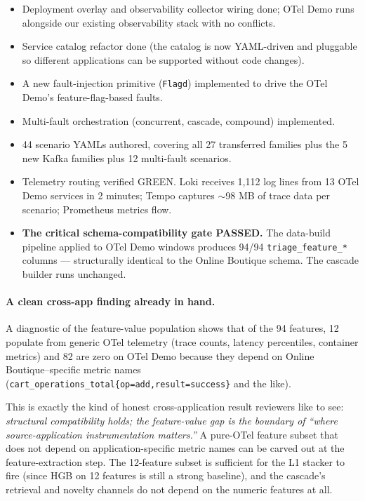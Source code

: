 \begin{itemize}
\item Deployment overlay and observability collector wiring done; OTel Demo runs alongside our existing observability stack with no conflicts.
\item Service catalog refactor done (the catalog is now YAML-driven and pluggable so different applications can be supported without code changes).
\item A new fault-injection primitive (\texttt{Flagd}) implemented to drive the OTel Demo's feature-flag-based faults.
\item Multi-fault orchestration (concurrent, cascade, compound) implemented.
\item 44 scenario YAMLs authored, covering all 27 transferred families plus the 5 new Kafka families plus 12 multi-fault scenarios.
\item Telemetry routing verified GREEN. Loki receives 1{,}112 log lines from 13 OTel Demo services in 2 minutes; Tempo captures $\sim$98 MB of trace data per scenario; Prometheus metrics flow.
\item \textbf{The critical schema-compatibility gate PASSED.} The data-build pipeline applied to OTel Demo windows produces 94/94 \texttt{triage\_feature\_*} columns --- structurally identical to the Online Boutique schema. The cascade builder runs unchanged.
\end{itemize}

\paragraph{A clean cross-app finding already in hand.} A diagnostic of the feature-value population shows that of the 94 features, 12 populate from generic OTel telemetry (trace counts, latency percentiles, container metrics) and 82 are zero on OTel Demo because they depend on Online Boutique--specific metric names (\texttt{cart\_operations\_total\{op=add,result=success\}} and the like).

This is exactly the kind of honest cross-application result reviewers like to see: \emph{structural compatibility holds; the feature-value gap is the boundary of ``where source-application instrumentation matters.''} A pure-OTel feature subset that does not depend on application-specific metric names can be carved out at the feature-extraction step. The 12-feature subset is sufficient for the L1 stacker to fire (since HGB on 12 features is still a strong baseline), and the cascade's retrieval and novelty channels do not depend on the numeric features at all.

